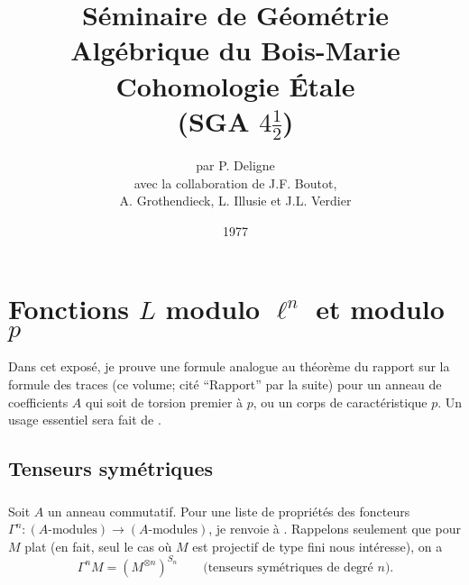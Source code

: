 \documentclass[oneside]{book}
\title{Séminaire de Géométrie Algébrique du Bois-Marie \\ \vspace{20pt}
Cohomologie Étale \\ \vspace{20pt}
(SGA $4\frac 1 2$)}
\author{par P. Deligne \vspace{10pt}\\ 
avec la collaboration de J.F. Boutot, \\ A. Grothendieck, L. Illusie et J.L. Verdier}
\date{1977}
\begin{document}
\maketitle







\tableofcontents





















\chapter{Fonctions \texorpdfstring{$L$}{L} modulo \texorpdfstring{$\ell^n$}{l n} et modulo \texorpdfstring{$p$}{p}}\label{III}

Dans cet expos\'e, je prouve une formule analogue au th\'eor\`eme du rapport sur 
la formule des traces (ce volume; cit\'e ``Rapport'' par la suite) pour un 
anneau de coefficients $A$ qui soit de torsion premier \`a $p$, ou un corps de 
caract\'eristique $p$. Un usage essentiel sera fait de \cite[XVII 5.5]{sga4}. 










\section{Tenseurs sym\'etriques}\label{III:1}





\subsection{}\label{III:1-1}

Soit $A$ un anneau commutatif. Pour une liste de propri\'et\'es des foncteurs 
$\Gamma^n:(\text{$A$-modules})\to (\text{$A$-modules})$, je renvoie \`a 
\cite[XVII 5.5.1 et 2]{sga4}. Rappelons seulement que pour $M$ plat (en fait, seul 
le cas o\`u $M$ est projectif de type fini nous int\'eresse), on a 
\[
  \Gamma^n M = \left(M^{\otimes n}\right)^{S_n} \qquad \text{(tenseurs sym\'etriques de degr\'e $n$).}
\]
\end{document}
